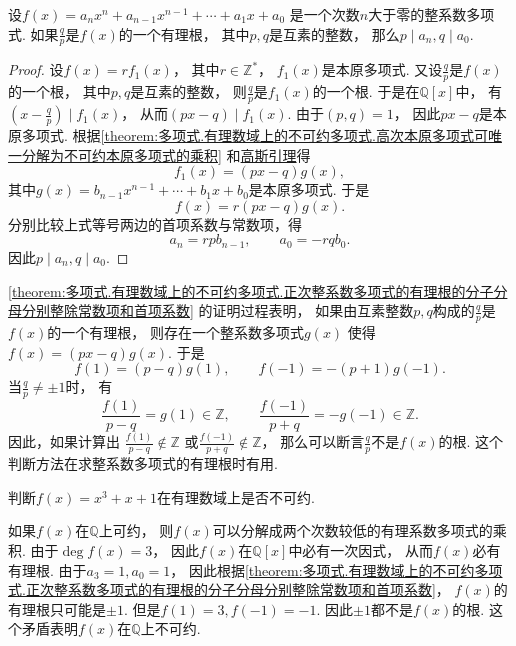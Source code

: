 \begin{theorem}\label{theorem:多项式.有理数域上的不可约多项式.正次整系数多项式的有理根的分子分母分别整除常数项和首项系数}
设\(f(x)=a_n x^n+a_{n-1} x^{n-1}+\dotsb+a_1 x+a_0\)
是一个次数\(n\)大于零的整系数多项式.
如果\(\frac{q}{p}\)是\(f(x)\)的一个有理根，
其中\(p,q\)是互素的整数，
那么\(p \mid a_n,
q \mid a_0\).
\begin{proof}
设\(f(x)=r f_1(x)\)，
其中\(r\in\mathbb{Z}^*\)，
\(f_1(x)\)是本原多项式.
又设\(\frac{q}{p}\)是\(f(x)\)的一个根，
其中\(p,q\)是互素的整数，
则\(\frac{q}{p}\)是\(f_1(x)\)的一个根.
于是在\(\mathbb{Q}[x]\)中，
有\(\left(x-\frac{q}{p}\right) \mid f_1(x)\)，
从而\((px-q) \mid f_1(x)\).
由于\((p,q)=1\)，
因此\(px-q\)是本原多项式.
根据\cref{theorem:多项式.有理数域上的不可约多项式.高次本原多项式可唯一分解为不可约本原多项式的乘积}
和\hyperref[theorem:多项式.有理数域上的不可约多项式.引理2]{高斯引理}得\[
	f_1(x)=(px-q) g(x),
\]
其中\(g(x)=b_{n-1} x^{n-1}+\dotsb+b_1 x+b_0\)是本原多项式.
于是\[
	f(x)=r(px-q) g(x).
\]
分别比较上式等号两边的首项系数与常数项，得\[
	a_n = r p b_{n-1}, \qquad
	a_0 = -r q b_0.
\]
因此\(p \mid a_n,
q \mid a_0\).
\end{proof}
\end{theorem}

\cref{theorem:多项式.有理数域上的不可约多项式.正次整系数多项式的有理根的分子分母分别整除常数项和首项系数}
的证明过程表明，
如果由互素整数\(p,q\)构成的\(\frac{q}{p}\)是\(f(x)\)的一个有理根，
则存在一个整系数多项式\(g(x)\)
使得\(f(x)=(px-q) g(x)\).
于是\[
	f(1)=(p-q) g(1), \qquad
	f(-1)=-(p+1) g(-1).
\]
当\(\frac{q}{p}\neq\pm1\)时，
有\[
	\frac{f(1)}{p-q}=g(1)\in\mathbb{Z}, \qquad
	\frac{f(-1)}{p+q}=-g(-1)\in\mathbb{Z}.
\]
因此，如果计算出
\(\frac{f(1)}{p-q}\notin\mathbb{Z}\)
或\(\frac{f(-1)}{p+q}\notin\mathbb{Z}\)，
那么可以断言\(\frac{q}{p}\)不是\(f(x)\)的根.
这个判断方法在求整系数多项式的有理根时有用.

\begin{example}
判断\(f(x)=x^3+x+1\)在有理数域上是否不可约.
\begin{solution}
如果\(f(x)\)在\(\mathbb{Q}\)上可约，
则\(f(x)\)可以分解成两个次数较低的有理系数多项式的乘积.
由于\(\deg f(x)=3\)，
因此\(f(x)\)在\(\mathbb{Q}[x]\)中必有一次因式，
从而\(f(x)\)必有有理根.
由于\(a_3=1,a_0=1\)，
因此根据\cref{theorem:多项式.有理数域上的不可约多项式.正次整系数多项式的有理根的分子分母分别整除常数项和首项系数}，
\(f(x)\)的有理根只可能是\(\pm1\).
但是\(f(1)=3,
f(-1)=-1\).
因此\(\pm1\)都不是\(f(x)\)的根.
这个矛盾表明\(f(x)\)在\(\mathbb{Q}\)上不可约.
\end{solution}
\end{example}

